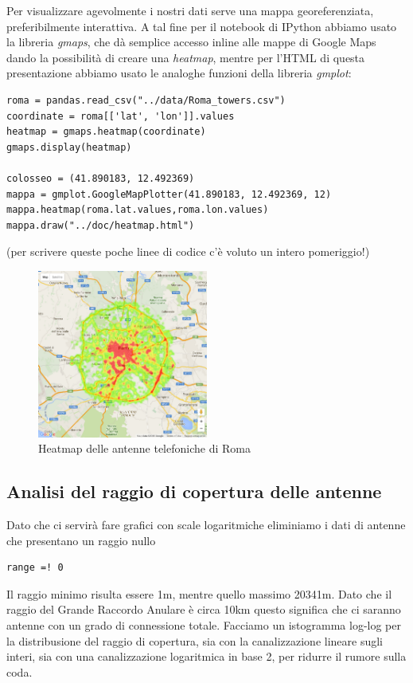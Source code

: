 Per visualizzare agevolmente i nostri dati serve una mappa georeferenziata, preferibilmente interattiva. A tal fine per il notebook di IPython abbiamo usato la libreria \emph{gmaps}, che dà semplice accesso inline alle mappe di Google Maps dando la possibilità di creare una \emph{heatmap}, mentre per l'HTML di questa presentazione abbiamo usato le analoghe funzioni della libreria \emph{gmplot}:

\begin{lstlisting}
roma = pandas.read_csv("../data/Roma_towers.csv")
coordinate = roma[['lat', 'lon']].values
heatmap = gmaps.heatmap(coordinate)
gmaps.display(heatmap)

colosseo = (41.890183, 12.492369)
mappa = gmplot.GoogleMapPlotter(41.890183, 12.492369, 12)
mappa.heatmap(roma.lat.values,roma.lon.values)
mappa.draw("../doc/heatmap.html")
\end{lstlisting}
(per scrivere queste poche linee di codice c'è voluto un intero pomeriggio!)

\begin{figure}[ht!]
	\centering
	\includegraphics[width=0.5\textwidth]{./Immagini/Dati/Ourmap.png}
	\caption{Heatmap delle antenne telefoniche di Roma}
	\label{fig:happ}
\end{figure}

\subsection{Analisi del raggio di copertura delle antenne}
Dato che ci servirà fare grafici con scale logaritmiche eliminiamo i dati di antenne che presentano un raggio nullo

\begin{lstlisting}
range =! 0
\end{lstlisting}

Il raggio minimo risulta essere 1m, mentre quello massimo 20341m. Dato che il raggio del Grande Raccordo Anulare è circa 10km questo significa che ci saranno antenne con un grado di connessione totale.
Facciamo un istogramma log-log per la distribusione del raggio di copertura, sia con la canalizzazione lineare sugli interi, sia con una canalizzazione logaritmica in base 2, per ridurre il rumore sulla coda.

